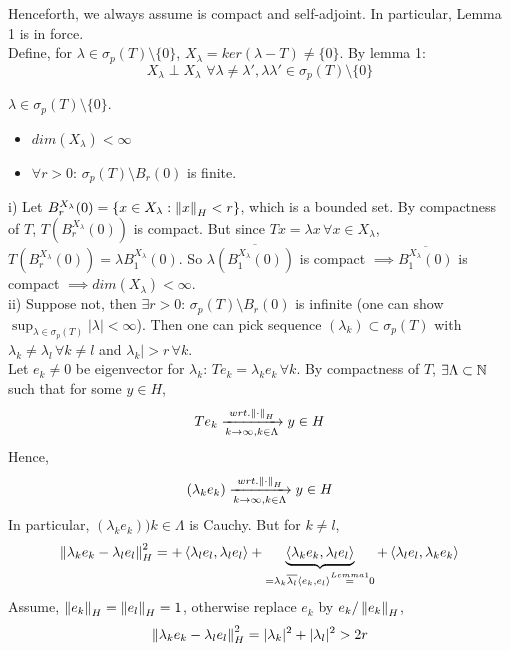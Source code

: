\documentclass{article}
\begin{document}
Henceforth, we always assume  is compact and self-adjoint. In particular, Lemma 1 is in force.\\
Define, for $\lambda\in\sigma_p(T)\setminus\{0\}$, $X_\lambda=ker(\lambda-T)\neq\{0\}$. By lemma 1:
$$X_\lambda\perp X_\lambda\,\,\forall\lambda\neq\lambda',\lambda\lambda'\in\sigma_p(T)\setminus\{0\}$$
\begin{lemma}[Lemma 2]
	$\lambda\in\sigma_p(T)\setminus\{0\}$.
	\begin{itemize}
		\item $dim(X_\lambda)<\infty$
		\item $\forall r>0$: $\sigma_p(T)\setminus B_r(0)$ is finite.
	\end{itemize}
	\begin{pf}{}{}
		i) Let $B_r^{X_\lambda}(0)=\{x\in X_\lambda:\left\|{x}\right\|_H<r\}$, which is a bounded set. By compactness of $T$, $T(B_r^{X_\lambda}(0))$ is compact. But since $Tx=\lambda x\,\forall x\in X_\lambda$, $T(B_r^{X_\lambda}(0))=\lambda B_1^{X_\lambda}(0)$. So $\lambda\overline{(B_1^{X_\lambda}(0))}$ is compact $\implies \overline{B_1^{X_\lambda}(0)}$ is compact $\implies dim(X_\lambda)<\infty$.\\
		ii) Suppose not, then $\exists r>0$: $\sigma_p(T)\setminus B_r(0)$ is infinite (one can show $\sup_{\lambda\in\sigma_p(T)}|\lambda|<\infty$). Then one can pick sequence $(\lambda_k)\subset\sigma_p(T)$ with $\lambda_k\neq\lambda_l\,\forall k\neq l$ and $\lambda_k|>r\,\forall k$.\\
		Let $e_k\neq0$ be eigenvector for $\lambda_k$: $Te_k=\lambda_ke_k\,\forall k$.
		By compactness of $T$, $\exists\Lambda\subset\mathbb{N}$ such that for some $y\in H$, $$Te_k\xrightarrow[k\to\infty,k\in\Lambda]{wrt.\left\|{\cdot}\right\|_H}y\in H$$
		Hence,
		$$(\lambda_ke_k)\xrightarrow[k\to\infty,k\in\Lambda]{wrt.\left\|{\cdot}\right\|_H}y\in H$$
		In particular, $(\lambda_ke_k)){k\in\Lambda}$ is Cauchy. But for $k\neq l$,
		$$\left\|{\lambda_ke_k-\lambda_le_l}\right\|^2_H=
			+\left<{\lambda_le_l},{\lambda_le_l}\right>
			+\underbrace{\left<{\lambda_ke_k},{\lambda_le_l}\right>}_{=\lambda_k\overline{\lambda_l}\left<{e_k},{e_l}\right>\stackrel{Lemma1}{=}0}
			+\left<{\lambda_le_l},{\lambda_ke_k}\right>
		$$
		Assume, $\left\|{e_k}\right\|_H=\left\|{e_l}\right\|_H=1$, otherwise replace $e_k$ by $e_k/\left\|{e_k}\right\|_H$,
		$$
			\left\|{\lambda_ke_k-\lambda_le_l}\right\|^2_H=|\lambda_k|^2+|\lambda_l|^2>2r
		$$
	\end{pf}
\end{lemma}
\end{document}

